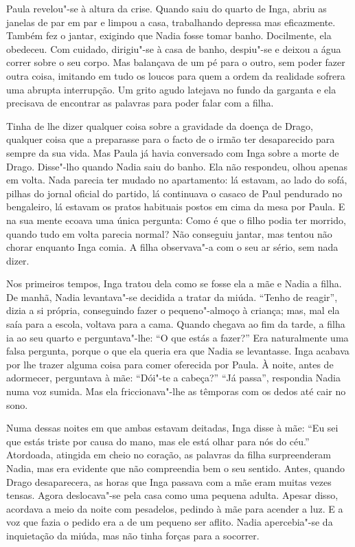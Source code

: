 Paula revelou"-se à altura da crise. Quando saiu do quarto de Inga, abriu
as janelas de par em par e limpou a casa, trabalhando depressa mas
eficazmente. Também fez o jantar, exigindo que Nadia fosse tomar banho.
Docilmente, ela obedeceu. Com cuidado, dirigiu"-se à casa de banho,
despiu"-se e deixou a água correr sobre o seu corpo. Mas balançava de um
pé para o outro, sem poder fazer outra coisa, imitando em tudo os loucos
para quem a ordem da realidade sofrera uma abrupta interrupção. Um grito
agudo latejava no fundo da garganta e ela precisava de encontrar as
palavras para poder falar com a filha.

Tinha de lhe dizer qualquer coisa sobre a gravidade da doença de Drago,
qualquer coisa que a preparasse para o facto de o irmão ter desaparecido
para sempre da sua vida. Mas Paula já havia conversado com Inga sobre a
morte de Drago. Disse"-lho quando Nadia saiu do banho. Ela não respondeu,
olhou apenas em volta. Nada parecia ter mudado no apartamento: lá
estavam, ao lado do sofá, pilhas do jornal oficial do partido, lá
continuava o casaco de Paul pendurado no bengaleiro, lá estavam os
pratos habituais postos em cima da mesa por Paula. E na sua mente ecoava
uma única pergunta: Como é que o filho podia ter morrido, quando tudo em
volta parecia normal? Não conseguiu jantar, mas tentou não chorar
enquanto Inga comia. A filha observava"-a com o seu ar sério, sem
nada dizer.

Nos primeiros tempos, Inga tratou dela como se fosse ela a mãe e Nadia a
filha. De manhã, Nadia levantava"-se decidida a tratar da miúda. ``Tenho
de reagir'', dizia a si própria, conseguindo fazer o pequeno"-almoço à
criança; mas, mal ela saía para a escola, voltava para a cama. Quando
chegava ao fim da tarde, a filha ia ao seu quarto e perguntava"-lhe: ``O
que estás a fazer?'' Era naturalmente uma falsa pergunta, porque o que
ela queria era que Nadia se levantasse. Inga acabava por lhe trazer
alguma coisa para comer oferecida por Paula. À noite, antes de adormecer, perguntava à mãe: ``Dói"-te a cabeça?'' ``Já passa'', respondia Nadia
numa voz sumida. Mas ela friccionava"-lhe as têmporas com os dedos até
cair no sono.

Numa dessas noites em que ambas estavam deitadas,
Inga disse à mãe: ``Eu sei que estás triste por causa do
mano, mas ele está olhar para nós do céu.'' Atordoada, atingida em cheio
no coração, as palavras da filha surpreenderam Nadia, mas era evidente
que não compreendia bem o seu sentido. Antes, quando Drago desaparecera,
as horas que Inga passava com a mãe eram muitas vezes tensas. Agora
deslocava"-se pela casa como uma pequena adulta. Apesar disso, acordava a
meio da noite com pesadelos, pedindo à mãe para acender a luz. E a voz
que fazia o pedido era a de um pequeno ser aflito. Nadia apercebia"-se da inquietação da miúda, mas não tinha forças para a socorrer.

